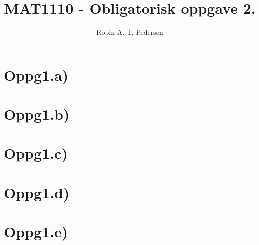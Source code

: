 \documentclass{article}
\begin{document}
  \title{MAT1110 - Obligatorisk oppgave 2.}
  \author{Robin A. T. Pedersen}
  \maketitle

  \section{Oppg1.a)}
    
  \section{Oppg1.b)}
    
  \section{Oppg1.c)}
    
  \section{Oppg1.d)}
    
  \section{Oppg1.e)}
    
\end{document}
